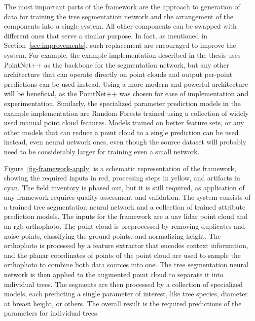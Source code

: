 The most important parts of the framework are the approach to generation of data for training the tree segmentation network and the arrangement of the components into a single system.
All other components can be swapped with different ones that serve a similar purpose.
In fact, as mentioned in Section~\ref{sec:improvements}, such replacement are encouraged to improve the system.
For example, the example implementation described in the thesis uses PointNet++ as the backbone for the segmentation network, but any other architecture that can operate directly on point clouds and output per-point predictions can be used instead.
Using a more modern and powerful architecture will be beneficial, as the PointNet++ was chosen for ease of implementation and experimentation.
Similarly, the specialized parameter prediction models in the example implementation are Random Forests trained using a collection of widely used manual point cloud features.
Models trained on better feature sets, or any other models that can reduce a point cloud to a single prediction can be used instead, even neural network ones, even though the source dataset will probably need to be considerably larger for training even a small network.

Figure~\ref{fig-framework-apply} is a schematic representation of the framework, showing the required inputs in red, processing steps in yellow, and artifacts in cyan.
The field inventory is phased out, but it is still required, as application of any framework requires quality assessment and validation.
The system consists of a trained tree segmentation neural network and a collection of trained attribute prediction models.
The inputs for the framework are a \gls{uav} \gls{lidar} point cloud and an \gls{rgb} orthophoto.
The point cloud is preprocessed by removing duplicates and noise points, classifying the ground points, and normalizing height.
The orthophoto is processed by a feature extractor that encodes context information, and the planar coordinates of points of the point cloud are used to sample the orthophoto to combine both data sources into one.
The tree segmentation neural network is then applied to the augmented point cloud to separate it into individual trees.
The segments are then processed by a collection of specialized models, each predicting a single parameter of interest, like tree species, diameter at breast height, or others.
The overall result is the required predictions of the parameters for individual trees.

